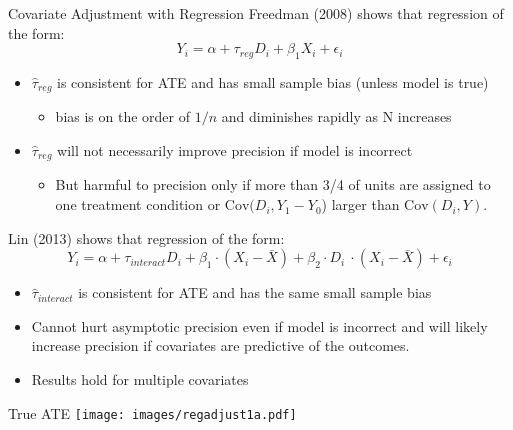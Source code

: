 \documentclass{beamer}
\numberwithin{equation}{section}
\begin{document}
\begin{frame}{Covariate Adjustment with Regression}
\small
Freedman (2008) shows that regression of the form:
\[ Y_i = \alpha + \tau_{reg} D_i + \beta_1 X_i  + \epsilon_i \]

\begin{itemize}
\itemsep1pt\parskip0pt
\item $\hat{\tau}_{reg}$ is consistent for ATE and has small sample bias  (unless model is true)
\begin{itemize}
\item bias is on the order of $1/n$ and diminishes rapidly as N increases
\end{itemize}
\item $\hat{\tau}_{reg}$ will not necessarily improve precision if model is incorrect
\begin{itemize}
\item But harmful to precision only if more than 3/4 of units are assigned
  to one treatment condition or $\text{Cov}(D_i,  Y_1 - Y_0$) larger than
  $\text{Cov}(D_i, Y)$.
\end{itemize}
\end{itemize}

Lin (2013) shows that regression of the form:
\[ Y_i = \alpha + \tau_{interact} D_i + \beta_1 \cdot (X_i - \bar X) + \beta_2 \cdot D_i \ \cdot (X_i - \bar X)  + \epsilon_i \]\vspace{-.2in}
\begin{itemize}
\item $\hat{\tau}_{interact}$ is consistent for ATE and has the same small sample bias
\item  Cannot hurt asymptotic precision even if model is incorrect and will likely increase precision if covariates are predictive of the outcomes. 
\item Results hold for multiple covariates
\end{itemize}

\end{frame}





\begin{frame}{True ATE}
\centering
    \texttt{[image: images/regadjust1a.pdf]}
\end{frame}

\end{document}
